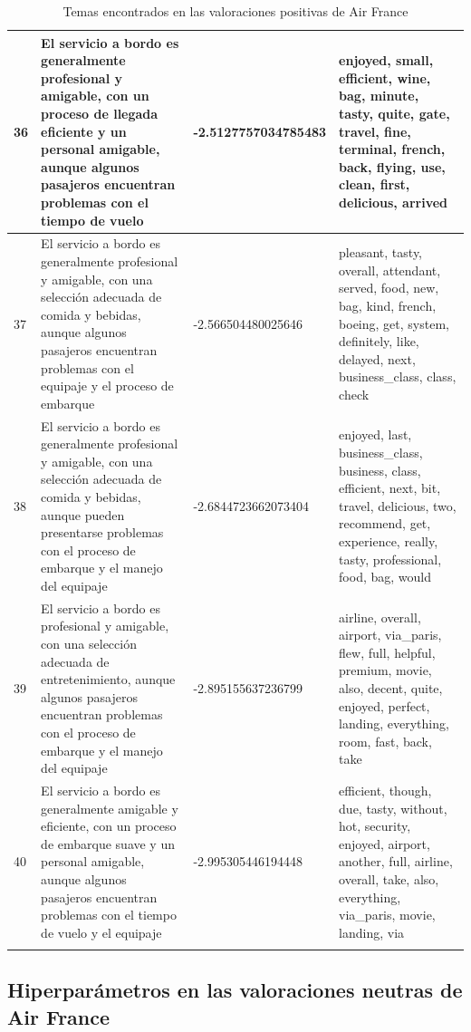 \documentclass{report}
\begin{document}
\begin{longtable}{|p{1cm}|p{4cm}|p{4cm}|p{6cm}|}
                    \hline
                    36 & El servicio a bordo es generalmente profesional y amigable, con un proceso de llegada eficiente y un personal amigable, aunque algunos pasajeros encuentran problemas con el tiempo de vuelo & -2.5127757034785483 & enjoyed, small, efficient, wine, bag, minute, tasty, quite, gate, travel, fine, terminal, french, back, flying, use, clean, first, delicious, arrived \\
                    \hline
                    37 & El servicio a bordo es generalmente profesional y amigable, con una selección adecuada de comida y bebidas, aunque algunos pasajeros encuentran problemas con el equipaje y el proceso de embarque & -2.566504480025646 & pleasant, tasty, overall, attendant, served, food, new, bag, kind, french, boeing, get, system, definitely, like, delayed, next, business\_class, class, check \\
                    \hline
                    38 & El servicio a bordo es generalmente profesional y amigable, con una selección adecuada de comida y bebidas, aunque pueden presentarse problemas con el proceso de embarque y el manejo del equipaje & -2.6844723662073404 & enjoyed, last, business\_class, business, class, efficient, next, bit, travel, delicious, two, recommend, get, experience, really, tasty, professional, food, bag, would \\
                    \hline
                    39 & El servicio a bordo es profesional y amigable, con una selección adecuada de entretenimiento, aunque algunos pasajeros encuentran problemas con el proceso de embarque y el manejo del equipaje & -2.895155637236799 & airline, overall, airport, via\_paris, flew, full, helpful, premium, movie, also, decent, quite, enjoyed, perfect, landing, everything, room, fast, back, take \\
                    \hline
                    40 & El servicio a bordo es generalmente amigable y eficiente, con un proceso de embarque suave y un personal amigable, aunque algunos pasajeros encuentran problemas con el tiempo de vuelo y el equipaje & -2.995305446194448 & efficient, though, due, tasty, without, hot, security, enjoyed, airport, another, full, airline, overall, take, also, everything, via\_paris, movie, landing, via \\
                    \hline
                    \caption{Temas encontrados en las valoraciones positivas de Air France}
                \end{longtable}
            \clearpage\subsection{Hiperparámetros en las valoraciones neutras de Air France}
\end{document}
